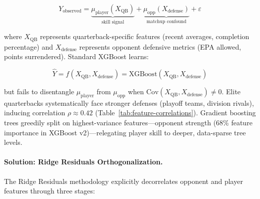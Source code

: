 \begin{equation}
Y_{\text{observed}} = \underbrace{\mu_{\text{player}}(X_{\text{QB}})}_{\text{skill signal}} + \underbrace{\mu_{\text{opp}}(X_{\text{defense}})}_{\text{matchup confound}} + \varepsilon
\label{eq:confound-decomposition}
\end{equation}

where $X_{\text{QB}}$ represents quarterback-specific features (recent averages, completion percentage) and $X_{\text{defense}}$ represents opponent defensive metrics (EPA allowed, points surrendered). Standard XGBoost learns:

\begin{equation}
\hat{Y} = f(X_{\text{QB}}, X_{\text{defense}}) = \text{XGBoost}(X_{\text{QB}}, X_{\text{defense}})
\end{equation}

but fails to disentangle $\mu_{\text{player}}$ from $\mu_{\text{opp}}$ when $\text{Cov}(X_{\text{QB}}, X_{\text{defense}}) \neq 0$. Elite quarterbacks systematically face stronger defenses (playoff teams, division rivals), inducing correlation $\rho \approx 0.42$ (Table~\ref{tab:feature-correlations}). Gradient boosting trees greedily split on highest-variance features---opponent strength (68\% feature importance in XGBoost v2)---relegating player skill to deeper, data-sparse tree levels.

\paragraph{Solution: Ridge Residuals Orthogonalization.}
The Ridge Residuals methodology explicitly decorrelates opponent and player features through three stages:

